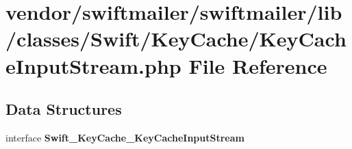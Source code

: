 \section{vendor/swiftmailer/swiftmailer/lib/classes/\+Swift/\+Key\+Cache/\+Key\+Cache\+Input\+Stream.php File Reference}
\label{_key_cache_input_stream_8php}
\subsection*{Data Structures}
\begin{DoxyCompactItemize}
\item 
interface {\bf Swift\+\_\+\+Key\+Cache\+\_\+\+Key\+Cache\+Input\+Stream}
\end{DoxyCompactItemize}
